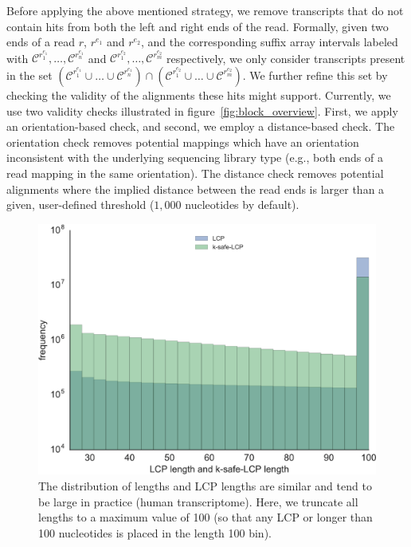 Before applying the above mentioned strategy, we remove transcripts that do not contain hits from both the left 
and right ends of the read. Formally, given two ends of a read $r$, $r^{e_1}$ and $r^{e_2}$, and the corresponding 
suffix array intervals labeled with $\mathcal{C}^{r_1^{e_1}}, \ldots, \mathcal{C}^{r_n^{e_1}}$ and 
$\mathcal{C}^{r_1^{e_2}}, \ldots, \mathcal{C}^{r_m^{e_2}}$ respectively, we only consider transcripts present in 
the set $(\mathcal{C}^{r_1^{e_1}} \cup \ldots \cup \mathcal{C}^{r_n^{e_1}}) \cap (\mathcal{C}^{r_1^{e_2}} 
\cup \ldots \cup \mathcal{C}^{r_m^{e_2}})$.
We further refine this set by checking the validity of the alignments these hits might support. Currently, 
we use two validity checks illustrated in figure~\ref{fig:block_overview}. First, we apply an orientation-based 
check, and second, we employ a distance-based check. The orientation check removes potential mappings which have 
an orientation inconsistent with the underlying sequencing library type (e.g., both ends of a read mapping in the 
same orientation). The distance check removes potential alignments where the implied distance between the read 
ends is larger than a given, user-defined threshold ($1,000$ nucleotides by default).

\begin{figure}
 \centering
 \includegraphics[scale=0.40]{Figures/sla/dist_safelength-color}
 \caption[The distribution of \kslcp lengths and LCP lengths]{The distribution of \kslcp lengths and LCP lengths 
 are similar and tend to be large in practice (human transcriptome).  Here, we truncate all lengths to a maximum 
 value of 100 (so that any LCP or \kslcp longer than 100 nucleotides is placed in the length 100 bin).}
\label{fig:dist}
\end{figure}

